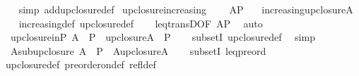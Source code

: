 \begin{isabellebody}
%
\isadelimproof
\ \ %
\endisadelimproof
%
\isatagproof
{}\isamarkupfalse%
\ {\isacharparenleft}{\kern0pt}simp\ add{\isacharcolon}{\kern0pt}upclosure{\isacharunderscore}{\kern0pt}def{\isacharparenright}{\kern0pt}%
\endisatagproof
{\isafoldproof}%
%
\isadelimproof
\isanewline
%
\endisadelimproof
\isanewline
{}\isamarkupfalse%
\ upclosure{\isacharunderscore}{\kern0pt}increasing\ {\isacharcolon}{\kern0pt}\isanewline
\ \ \ {\isachardoublequoteopen}A{\isasymsubseteq}P{\isachardoublequoteclose}\isanewline
\ \ \ {\isachardoublequoteopen}increasing{\isacharparenleft}{\kern0pt}upclosure{\isacharparenleft}{\kern0pt}A{\isacharparenright}{\kern0pt}{\isacharparenright}{\kern0pt}{\isachardoublequoteclose}\isanewline
%
\isadelimproof
\ \ %
\endisadelimproof
%
\isatagproof
{}\isamarkupfalse%
\ increasing{\isacharunderscore}{\kern0pt}def\ upclosure{\isacharunderscore}{\kern0pt}def\isanewline
\ \ \isamarkupfalse%
\ leq{\isacharunderscore}{\kern0pt}transD{\isacharprime}{\kern0pt}{\isacharbrackleft}{\kern0pt}OF\ {\isacartoucheopen}A{\isasymsubseteq}P{\isacartoucheclose}{\isacharbrackright}{\kern0pt}\ \isamarkupfalse%
\ auto%
\endisatagproof
{\isafoldproof}%
%
\isadelimproof
\isanewline
%
\endisadelimproof
\isanewline
{}\isamarkupfalse%
\ \ upclosure{\isacharunderscore}{\kern0pt}in{\isacharunderscore}{\kern0pt}P{\isacharcolon}{\kern0pt}\ {\isachardoublequoteopen}A\ {\isasymsubseteq}\ P\ {\isasymLongrightarrow}\ upclosure{\isacharparenleft}{\kern0pt}A{\isacharparenright}{\kern0pt}\ {\isasymsubseteq}\ P{\isachardoublequoteclose}\isanewline
%
\isadelimproof
\ \ %
\endisadelimproof
%
\isatagproof
{}\isamarkupfalse%
\ subsetI\ upclosure{\isacharunderscore}{\kern0pt}def\ \isamarkupfalse%
\ simp%
\endisatagproof
{\isafoldproof}%
%
\isadelimproof
\isanewline
%
\endisadelimproof
\isanewline
{}\isamarkupfalse%
\ \ A{\isacharunderscore}{\kern0pt}sub{\isacharunderscore}{\kern0pt}upclosure{\isacharcolon}{\kern0pt}\ {\isachardoublequoteopen}A\ {\isasymsubseteq}\ P\ {\isasymLongrightarrow}\ A{\isasymsubseteq}upclosure{\isacharparenleft}{\kern0pt}A{\isacharparenright}{\kern0pt}{\isachardoublequoteclose}\isanewline
%
\isadelimproof
\ \ %
\endisadelimproof
%
\isatagproof
{}\isamarkupfalse%
\ subsetI\ leq{\isacharunderscore}{\kern0pt}preord\ \isanewline
\ \ \isamarkupfalse%
\ upclosure{\isacharunderscore}{\kern0pt}def\ preorder{\isacharunderscore}{\kern0pt}on{\isacharunderscore}{\kern0pt}def\ refl{\isacharunderscore}{\kern0pt}def\ \isamarkupfalse%

\end{isabellebody}
